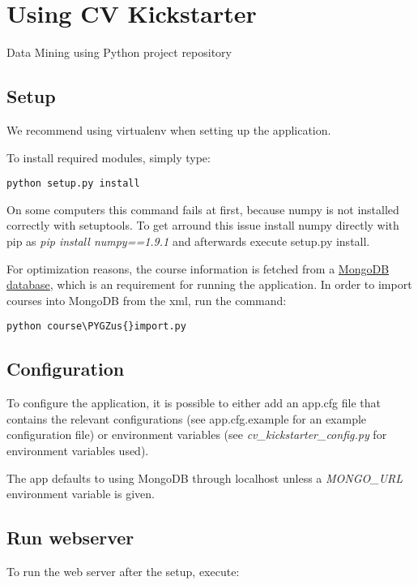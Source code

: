 \documentclass[letterpaper,10pt,english]{sphinxmanual}
\def\PYGZus{\char`\_}
\begin{document}
\chapter{Using CV Kickstarter}
\label{index:using-cv-kickstarter}
Data Mining using Python project repository


\section{Setup}
\label{index:setup}
We recommend using virtualenv when setting up the application.

To install required modules, simply type:

\begin{Verbatim}[commandchars=\\\{\}]
python setup.py install
\end{Verbatim}

On some computers this command fails at first, because numpy is not installed correctly with setuptools. To get arround this issue install numpy directly with pip as \emph{pip install numpy==1.9.1} and afterwards execute setup.py install.

For optimization reasons, the course information is fetched from a \href{http://www.mongodb.org}{MongoDB database}, which is an requirement for running the application. In order to import courses into MongoDB from the xml, run the command:

\begin{Verbatim}[commandchars=\\\{\}]
python course\PYGZus{}import.py
\end{Verbatim}


\section{Configuration}
\label{index:configuration}
To configure the application, it is possible to either add an app.cfg file that contains the relevant configurations (see app.cfg.example for an example configuration file) or environment variables (see \emph{cv\_kickstarter\_config.py} for environment variables used).

The app defaults to using MongoDB through localhost unless a \emph{MONGO\_URL} environment variable is given.


\section{Run webserver}
\label{index:run-webserver}
To run the web server after the setup, execute:
\end{document}
